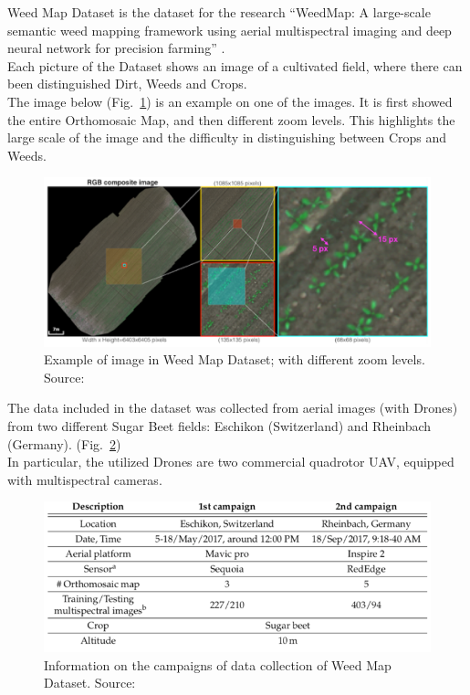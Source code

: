 Weed Map Dataset is the dataset for the research “WeedMap: A large-scale semantic weed mapping framework using aerial multispectral imaging and deep neural network for precision farming” \cite{Tesi-2.1}.
\\[0.3cm]Each picture of the Dataset shows an image of a cultivated field, where there can been distinguished Dirt, Weeds and Crops.
\\[0.3cm]The image below (Fig.~\ref{fig:figure-4.5.1}) is an example on one of the images. It is first showed the entire Orthomosaic Map, and then different zoom levels. This highlights the large scale of the image and the difficulty in distinguishing between Crops and Weeds.
\begin{figure}[t]
	\centering
	\includegraphics[width=14cm]{figures/figure-4.5.1.png}
	\caption[Example of image in Weed Map Dataset]{Example of image in Weed Map Dataset; with different zoom levels. Source:~\cite{Tesi-2.1}}
	\label{fig:figure-4.5.1}
\end{figure}

The data included in the dataset was collected from aerial images (with Drones) from two different Sugar Beet fields: Eschikon (Switzerland) and Rheinbach (Germany). (Fig.~\ref{fig:figure-4.5.2})
\\[0.3cm]In particular, the utilized Drones are two commercial quadrotor UAV, equipped with multispectral cameras.
\begin{figure}[t]
	\centering
	\includegraphics[width=13cm]{figures/figure-4.5.2.png}
	\caption[Information on Campaigns of Weed Map Dataset]{Information on the campaigns of data collection of Weed Map Dataset. Source:~\cite{Tesi-2.1}}
	\label{fig:figure-4.5.2}
\end{figure}

